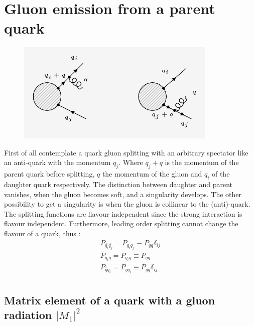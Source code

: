 \section{Gluon emission from a parent quark}
\label{fir}
\begin{figure}[ht!]
\centering
\includegraphics[width=0.85\textwidth]{images/QQ/qqg-diagrams.png}
\label{qg}
\end{figure}
First of all contemplate a quark gluon splitting with an arbitrary spectator like an anti-quark with the momentum $ q_j $. Where $ q_j+q $ is the momentum of the parent quark before splitting, $q$ the momentum of the gluon and $q_i$ of the daughter quark respectively. The distinction between daughter and parent vanishes, when the gluon becomes soft,  and a
singularity develops. The other possibility to get a singularity is when the gluon is collinear to the (anti)-quark. The splitting functions are flavour independent since the strong interaction is flavour independent. Furthermore, leading order splitting cannot change the flavour of a quark, thus \cite{halzen1984quarks}:
\begin{equation}
\begin{split}
P_{{\bar{q_i}}{\bar{q_j}}}=P_{{q_i}{q_j}}\equiv P_{{q}{q}} \delta_{ij}\\
P_{{\bar{q_i}}{{g}}}=P_{{q_i}{g}}\equiv P_{{q}{g}} \\
P_{{\bar{g}}{\bar{q_i}}}=P_{{g}{q_i}}\equiv P_{{g}{q}} \delta_{ij}\\
\end{split}
\end{equation}


\pagebreak
\subsection{Matrix element of a quark with a gluon radiation $ |M_1|^2 $}

